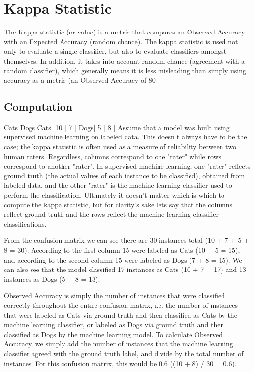\documentclass[caret-main.tex]{subfiles}
\begin{document}
\section{Kappa Statistic}

The Kappa statistic (or value) is a metric that compares an Observed Accuracy with an Expected Accuracy (random chance). The kappa statistic is used not only to evaluate a single classifier, but also to evaluate classifiers amongst themselves. In addition, it takes into account random chance (agreement with a random classifier), which generally means it is less misleading than simply using accuracy as a metric (an Observed Accuracy of 80%

\subsection{Computation}

     Cats Dogs
Cats| 10 | 7  |
Dogs| 5  | 8  |
Assume that a model was built using supervised machine learning on labeled data. This doesn't always have to be the case; the kappa statistic is often used as a measure of reliability between two human raters. Regardless, columns correspond to one "rater" while rows correspond to another "rater". In supervised machine learning, one "rater" reflects ground truth (the actual values of each instance to be classified), obtained from labeled data, and the other "rater" is the machine learning classifier used to perform the classification. Ultimately it doesn't matter which is which to compute the kappa statistic, but for clarity's sake lets say that the columns reflect ground truth and the rows reflect the machine learning classifier classifications.

From the confusion matrix we can see there are 30 instances total (10 + 7 + 5 + 8 = 30). According to the first column 15 were labeled as Cats (10 + 5 = 15), and according to the second column 15 were labeled as Dogs (7 + 8 = 15). We can also see that the model classified 17 instances as Cats (10 + 7 = 17) and 13 instances as Dogs (5 + 8 = 13).

Observed Accuracy is simply the number of instances that were classified correctly throughout the entire confusion matrix, i.e. the number of instances that were labeled as Cats via ground truth and then classified as Cats by the machine learning classifier, or labeled as Dogs via ground truth and then classified as Dogs by the machine learning model. To calculate Observed Accuracy, we simply add the number of instances that the machine learning classifier agreed with the ground truth label, and divide by the total number of instances. For this confusion matrix, this would be 0.6 ((10 + 8) / 30 = 0.6).
\end{document}

